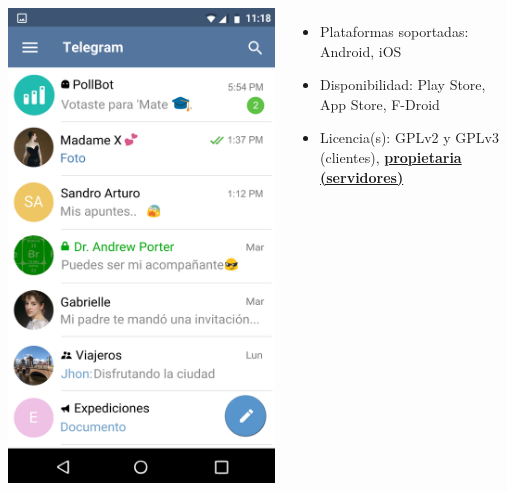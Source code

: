 \begin{frame}
\begin{columns}[c]
\begin{center}
                \includegraphics[height=0.5\textheight]{images/telegram-screencap.png}
            \end{center}
            \begin{itemize}
                \item Plataformas soportadas: Android, iOS
                \item Disponibilidad: Play Store, App Store, F-Droid
                \item Licencia(s): GPLv2 y GPLv3 (clientes), {\color{red}\textbf{\underline{propietaria (servidores)}}}
            \end{itemize}
    \end{columns}

\end{frame}

